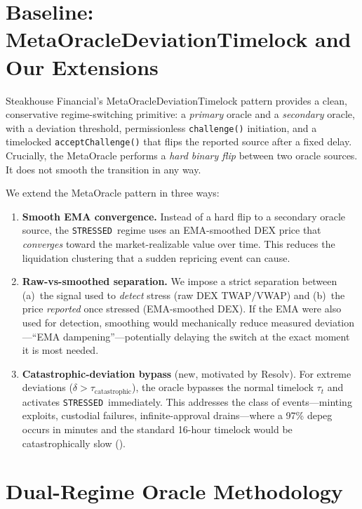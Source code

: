 \documentclass[11pt]{article}
\newcommand{\STRESSED}{\texttt{STRESSED}}
\begin{document}
\section{Baseline: MetaOracleDeviationTimelock and Our Extensions}
\label{sec:baseline}

Steakhouse Financial's MetaOracleDeviationTimelock pattern provides a clean, conservative regime-switching primitive: a \emph{primary} oracle and a \emph{secondary} oracle, with a deviation threshold, permissionless \texttt{challenge()} initiation, and a timelocked \texttt{acceptChallenge()} that flips the reported source after a fixed delay. Crucially, the MetaOracle performs a \emph{hard binary flip} between two oracle sources. It does not smooth the transition in any way.

We extend the MetaOracle pattern in three ways:

\begin{enumerate}[leftmargin=*]
\item \textbf{Smooth EMA convergence.} Instead of a hard flip to a secondary oracle source, the \STRESSED\ regime uses an EMA-smoothed DEX price that \emph{converges} toward the market-realizable value over time. This reduces the liquidation clustering that a sudden repricing event can cause.

\item \textbf{Raw-vs-smoothed separation.} We impose a strict separation between (a)~the signal used to \emph{detect} stress (raw DEX TWAP/VWAP) and (b)~the price \emph{reported} once stressed (EMA-smoothed DEX). If the EMA were also used for detection, smoothing would mechanically reduce measured deviation---``EMA dampening''---potentially delaying the switch at the exact moment it is most needed.

\item \textbf{Catastrophic-deviation bypass} (new, motivated by Resolv). For extreme deviations ($\delta > \tau_{\text{catastrophic}}$), the oracle bypasses the normal timelock $\tau_t$ and activates \STRESSED\ immediately. This addresses the class of events---minting exploits, custodial failures, infinite-approval drains---where a 97\% depeg occurs in minutes and the standard 16-hour timelock would be catastrophically slow ().
\end{enumerate}

\section{Dual-Regime Oracle Methodology}
\label{sec:methodology}
\end{document}
